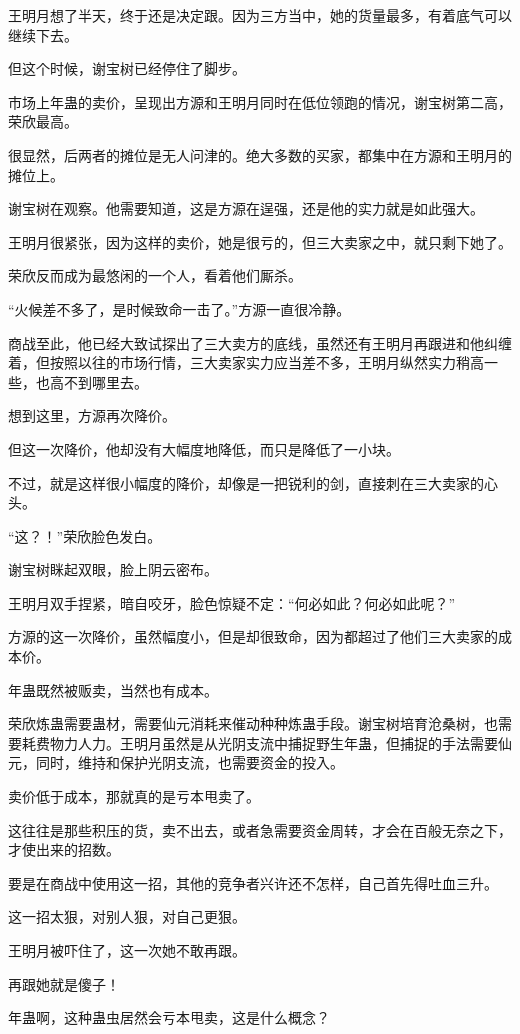 \begin{this_body}
王明月想了半天，终于还是决定跟。因为三方当中，她的货量最多，有着底气可以继续下去。

但这个时候，谢宝树已经停住了脚步。

市场上年蛊的卖价，呈现出方源和王明月同时在低位领跑的情况，谢宝树第二高，荣欣最高。

很显然，后两者的摊位是无人问津的。绝大多数的买家，都集中在方源和王明月的摊位上。

谢宝树在观察。他需要知道，这是方源在逞强，还是他的实力就是如此强大。

王明月很紧张，因为这样的卖价，她是很亏的，但三大卖家之中，就只剩下她了。

荣欣反而成为最悠闲的一个人，看着他们厮杀。

“火候差不多了，是时候致命一击了。”方源一直很冷静。

商战至此，他已经大致试探出了三大卖方的底线，虽然还有王明月再跟进和他纠缠着，但按照以往的市场行情，三大卖家实力应当差不多，王明月纵然实力稍高一些，也高不到哪里去。

想到这里，方源再次降价。

但这一次降价，他却没有大幅度地降低，而只是降低了一小块。

不过，就是这样很小幅度的降价，却像是一把锐利的剑，直接刺在三大卖家的心头。

“这？！”荣欣脸色发白。

谢宝树眯起双眼，脸上阴云密布。

王明月双手捏紧，暗自咬牙，脸色惊疑不定：“何必如此？何必如此呢？”

方源的这一次降价，虽然幅度小，但是却很致命，因为都超过了他们三大卖家的成本价。

年蛊既然被贩卖，当然也有成本。

荣欣炼蛊需要蛊材，需要仙元消耗来催动种种炼蛊手段。谢宝树培育沧桑树，也需要耗费物力人力。王明月虽然是从光阴支流中捕捉野生年蛊，但捕捉的手法需要仙元，同时，维持和保护光阴支流，也需要资金的投入。

卖价低于成本，那就真的是亏本甩卖了。

这往往是那些积压的货，卖不出去，或者急需要资金周转，才会在百般无奈之下，才使出来的招数。

要是在商战中使用这一招，其他的竞争者兴许还不怎样，自己首先得吐血三升。

这一招太狠，对别人狠，对自己更狠。

王明月被吓住了，这一次她不敢再跟。

再跟她就是傻子！

年蛊啊，这种蛊虫居然会亏本甩卖，这是什么概念？


\end{this_body}
